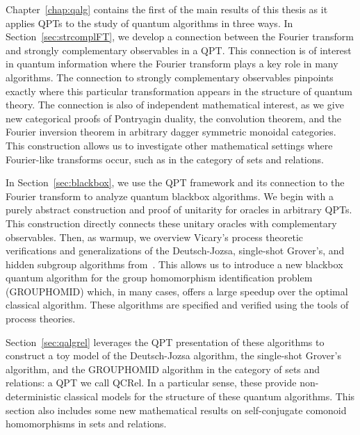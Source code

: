 Chapter~\ref{chap:qalg} contains the first of the main results of this thesis as it applies QPTs to the study of quantum algorithms in three ways.  In Section~\ref{sec:strcomplFT}, we develop a connection between the Fourier transform and strongly complementary observables in a QPT.  This connection is of interest in quantum information where the Fourier transform plays a key role in many algorithms.  The connection to strongly complementary observables pinpoints exactly where this particular transformation appears in the structure of quantum theory.  The connection is also of independent mathematical interest, as we give new categorical proofs of Pontryagin duality, the convolution theorem, and the Fourier inversion theorem in arbitrary dagger symmetric monoidal categories. This construction allows us to investigate other mathematical settings where Fourier-like transforms occur, such as in the category of sets and relations.

In Section~\ref{sec:blackbox}, we use the QPT framework and its connection to the Fourier transform to analyze quantum blackbox algorithms.  We begin with a purely abstract construction and proof of unitarity for oracles in arbitrary QPTs. This construction directly connects these unitary oracles with complementary observables. Then, as warmup, we overview Vicary's process theoretic verifications and generalizations  of the Deutsch-Jozsa, single-shot Grover's, and hidden subgroup algorithms from~\cite{vicary-tqa}.  This allows us to introduce a new blackbox quantum algorithm for the group homomorphism identification problem (GROUPHOMID) which, in many cases, offers a large speedup over the optimal classical algorithm. These algorithms are specified and verified using the tools of process theories.

Section~\ref{sec:qalgrel} leverages the QPT presentation of these algorithms to construct a toy model of the Deutsch-Jozsa algorithm, the single-shot Grover's algorithm, and the GROUPHOMID algorithm in the category of sets and relations: a QPT we call QCRel. In a particular sense, these provide non-deterministic classical models for the structure of these quantum algorithms. This section also includes some new mathematical results on self-conjugate comonoid homomorphisms in sets and relations.


